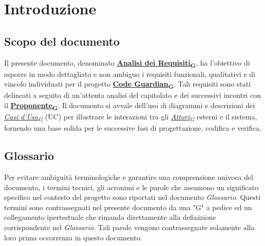 \documentclass[12pt, a4paper]{article}
\newcommand{\urlglossario}{https://skynetunigroup.github.io/Code_Guardian/Documentazione/PB/glossario_v2.0.0.pdf} %
\newcommand{\glo}[2]{\href{\urlglossario\#nameddest=#2}{#1\textsubscript{G}}}
\begin{document}

\tableofcontents
\iftotaltables  %
    \vspace{1cm}
    \listoftables
\fi

\iftotalfigures
    \vspace{1cm}
    \listoffigures
\fi
\newpage


\section{Introduzione}

\subsection{Scopo del documento}

Il presente documento, denominato \textbf{\glo{Analisi dei Requisiti}{analisi-dei-requisiti}}, ha
l'obiettivo di esporre in modo dettagliato e non ambiguo
i requisiti funzionali, qualitativi e di vincolo individuati per il
progetto \textbf{\glo{Code Guardian}{code-guardian}}. Tali requisiti sono stati delineati a
seguito di un'attenta analisi del capitolato e dei
successivi incontri con il \textbf{\glo{Proponente}{proponente}}. Il documento si avvale
dell'uso di diagrammi e descrizioni dei \textit{\glo{Casi d'Uso}{use-case}} (UC) per illustrare le interazioni tra gli \textit{\glo{Attori}{attore}}
esterni e il sistema, fornendo una base solida per le successive fasi di
progettazione, codifica e verifica.

\subsection{Glossario}

Per evitare ambiguità terminologiche e garantire una comprensione
univoca del documento, i termini tecnici, gli acronimi e le parole che
assumono un significato specifico nel contesto del progetto sono
riportati nel documento \emph{Glossario}. Questi termini sono
contrassegnati nel presente documento da una "G" a pedice ed un
collegamento ipertestuale che rimanda direttamente alla definizione
corrispondente nel \emph{Glossario}. Tali parole vengono contrassegnate
solamente alla loro prima occorrenza in questo documento.
\end{document}
